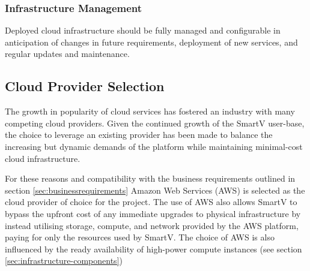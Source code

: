 \subsubsection*{Infrastructure Management}

Deployed cloud infrastructure should be fully managed and configurable in anticipation of changes in future requirements, deployment of new services, and regular updates and maintenance.


\subsection{Cloud Provider Selection}
The growth in popularity of cloud services has fostered an industry with many competing cloud providers. Given the continued growth of the SmartV user-base, the choice to leverage an existing provider has been made to balance the increasing but dynamic demands of the platform while maintaining minimal-cost cloud infrastructure.

For these reasons and compatibility with the business requirements outlined in section \ref{sec:businessrequirements} Amazon Web Services (AWS) is selected as the cloud provider of choice for the project. The use of AWS also allows SmartV to bypass the upfront cost of any immediate upgrades to physical infrastructure by instead utilising storage, compute, and network provided by the AWS platform, paying for only the resources used by SmartV. The choice of AWS is also influenced by the ready availability of high-power compute instances (see section \ref{sec:infrastructure-components})